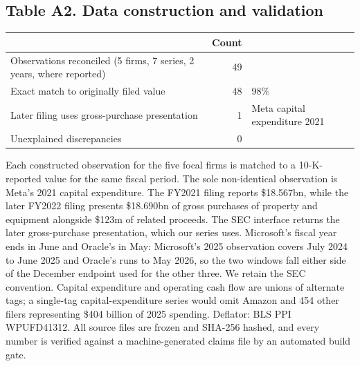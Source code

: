 \documentclass[preprint,11pt]{elsarticle}
\begin{document}
\subsection*{Table A2. Data construction and validation}
\begin{center}\footnotesize
\begin{tabular}{@{}p{8.4cm}rl@{}}
\toprule
& Count & \\
\midrule
Observations reconciled (5 firms, 7 series, 2 years, where reported) & 49 & \\
Exact match to originally filed value & 48 & 98\% \\
Later filing uses gross-purchase presentation & 1 & Meta capital expenditure 2021 \\
Unexplained discrepancies & 0 & \\
\bottomrule
\end{tabular}\end{center}
\noindent\footnotesize Each constructed observation for the five focal firms is matched to a
10-K-reported value for the same fiscal period. The sole non-identical observation is Meta's 2021
capital expenditure. The FY2021 filing reports \$18.567bn, while the later FY2022 filing presents
\$18.690bn of gross purchases of property and equipment alongside \$123m of related proceeds. The
SEC interface returns the later gross-purchase presentation, which our series uses. Microsoft's fiscal year ends in June and Oracle's in May: Microsoft's 2025 observation covers July
2024 to June 2025 and Oracle's runs to May 2026, so the two windows fall either side of the December
endpoint used for the other three. We retain the SEC convention.
Capital expenditure and operating cash flow are unions of alternate tags; a single-tag
capital-expenditure series would omit Amazon and 454 other filers representing \$404 billion of 2025
spending. Deflator: BLS PPI WPUFD41312. All source files are frozen and
SHA-256 hashed, and every number is verified against a machine-generated claims file by an automated
build gate.\normalsize
\end{document}
